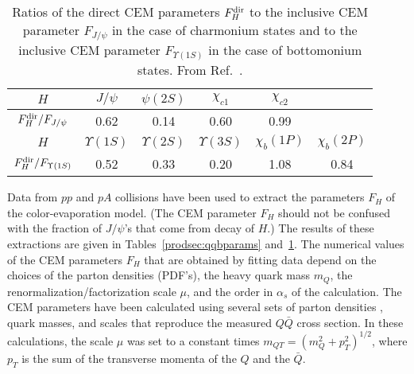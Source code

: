 \begin{table}[ht]
\begin{center}
\begin{tabular}{|c|ccccc|} 
\hline \hline
$H$ & $J/\psi$ & $\psi(2S)$ & $\chi_{c1}$ & $\chi_{c2}$ & \\ \hline
$F_H^{\rm dir}/F_{J/\psi}$       & 0.62 & 0.14 & 0.60 & 0.99 & \\ 
\hline \hline
$H$ & $\Upsilon(1S)$ & $\Upsilon(2S)$ & $\Upsilon(3S)$ 
        & $\chi_b(1P)$ & $\chi_b(2P)$ \\ \hline
$F_H^{\rm dir}/F_{\Upsilon(1S)}$ & 0.52 & 0.33 & 0.20 & 1.08 & 0.84 \\ 
\hline \hline
\end{tabular}
\caption{Ratios of the direct CEM parameters $F_H^{\rm dir}$ to the
inclusive CEM parameter $F_{J/\psi}$ in the case of charmonium states
and to the inclusive CEM parameter $F_{\Upsilon(1S)}$ in the case of
bottomonium states. From Ref.~\protect \cite{Digal:2001ue}.}
\label{prodsec:ratios}
\end{center}
\end{table}

Data from $pp$ and $pA$ collisions have been used
to extract the parameters $F_H$ of the color-evaporation model.
(The CEM parameter $F_H$ should not be confused with the fraction 
of $J/\psi$'s that come from decay of $H$.)
The results of these extractions are 
given in Tables~\ref{prodsec:qqbparams} and~\ref{prodsec:ratios}.
The numerical values of the CEM parameters $F_H$ that are obtained by
fitting data depend on the choices of the parton densities (PDF's), the
heavy quark mass $m_Q$, the renormalization/factorization scale $\mu$,
and the order in $\alpha_s$ of the calculation. The CEM parameters have
been calculated using several sets of parton densities
\cite{Martin:1998sq,Lai:1999wy,Gluck:1998xa}, quark masses, and scales
\cite{Vogt:2002vx,Vogt:2002ve} that reproduce the measured $Q \bar Q$
cross section. In these calculations, the scale $\mu$ was set to a
constant times $m_{QT} = (m_Q^2 + p_T^2)^{1/2}$, where $p_T$ is the sum
of the transverse momenta of the $Q$ and the $\bar Q$.

